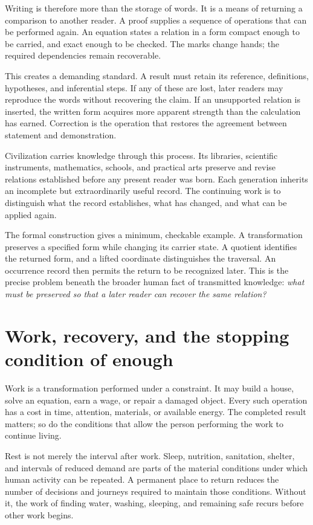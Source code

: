 \documentclass[10pt]{article}
\begin{document}
Writing is therefore more than the storage of words. It is a means of returning a comparison to another reader. A proof supplies a sequence of operations that can be performed again. An equation states a relation in a form compact enough to be carried, and exact enough to be checked. The marks change hands; the required dependencies remain recoverable.

This creates a demanding standard. A result must retain its reference, definitions, hypotheses, and inferential steps. If any of these are lost, later readers may reproduce the words without recovering the claim. If an unsupported relation is inserted, the written form acquires more apparent strength than the calculation has earned. Correction is the operation that restores the agreement between statement and demonstration.

Civilization carries knowledge through this process. Its libraries, scientific instruments, mathematics, schools, and practical arts preserve and revise relations established before any present reader was born. Each generation inherits an incomplete but extraordinarily useful record. The continuing work is to distinguish what the record establishes, what has changed, and what can be applied again.

The formal construction gives a minimum, checkable example. A transformation preserves a specified form while changing its carrier state. A quotient identifies the returned form, and a lifted coordinate distinguishes the traversal. An occurrence record then permits the return to be recognized later. This is the precise problem beneath the broader human fact of transmitted knowledge: \emph{what must be preserved so that a later reader can recover the same relation?}

\section{Work, recovery, and the stopping condition of enough}\label{sec:work}
Work is a transformation performed under a constraint. It may build a house, solve an equation, earn a wage, or repair a damaged object. Every such operation has a cost in time, attention, materials, or available energy. The completed result matters; so do the conditions that allow the person performing the work to continue living.

Rest is not merely the interval after work. Sleep, nutrition, sanitation, shelter, and intervals of reduced demand are parts of the material conditions under which human activity can be repeated. A permanent place to return reduces the number of decisions and journeys required to maintain those conditions. Without it, the work of finding water, washing, sleeping, and remaining safe recurs before other work begins.
\end{document}

